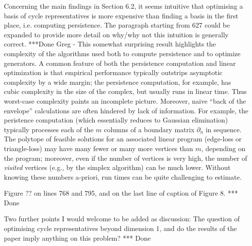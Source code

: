 \documentclass{article}
\begin{document}
Concerning the main findings in Section 6.2, it seems intuitive that optimising a basis of cycle representatives is more expensive than finding a basis in the first place, i.e. computing persistence. The paragraph starting from 627 could be expanded to provide more detail on why/why not this intuition is generally correct.
    ***Done
    Greg
    - This somewhat surprising result highlights the complexity of the algorithms used both to compute persistence and to optimize generators.  A common feature of both the persistence computation and linear optimization is that empirical performance  typically outstrips asymptotic complexity by a wide margin; the persistence computation, for example, has cubic complexity in the size of the complex, but usually runs in linear time.  Thus worst-case complexity paints an incomplete picture.   Moreover, naive ``back of the envelope'' calculations are often hindered by lack of information.  For example, the peristence computation (which essentially reduces to Gaussian elimination) typically processes each of the $m$ columns of a boundary matrix $\partial_n$ in sequence. The polytope of feasible solutions for an associated linear program (edge-loss or triangle-loss) may have many fewer or many more vertices than $m$, depending on the program; moreover, even if the number of vertices is very high, the number of \emph{visited} vertices (e.g., by the simplex algorithm) can be much lower.  Without knowing these numbers a-priori, run times can be quite challenging to estimate.



Figure ?? on lines 768 and 795, and on the last line of caption of Figure 8. *** Done

Two further points I would welcome to be added as discussion: The question of optimising cycle representatives beyond dimension 1, and do the results of the paper imply anything on this problem? 
*** Done
\end{document}
